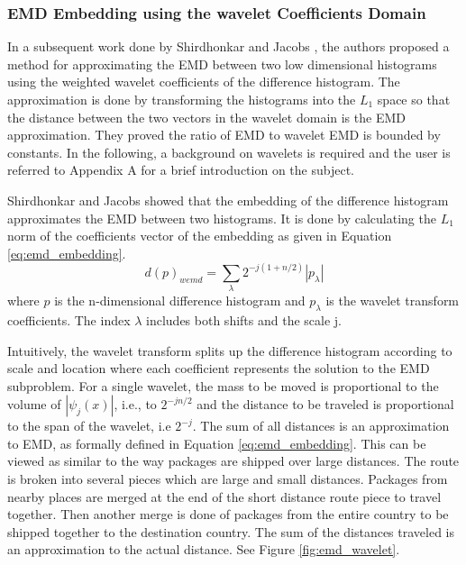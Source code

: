 \subsubsection{EMD Embedding using the wavelet Coefficients Domain}

\iftoggle{edit-mode}{\hspace{0pt}\marginpar{Wavelet embedding}}{}
In a subsequent work done by Shirdhonkar and Jacobs \cite{shirdhonkar2008approximate}, the authors proposed a method for approximating the EMD between two low dimensional histograms using the weighted wavelet coefficients of the difference histogram. The approximation is done by transforming the histograms into the $L_1$ space so that the distance between the two vectors in the wavelet domain is the EMD approximation. They proved the ratio of EMD to wavelet EMD is bounded by constants. In the following, a background on wavelets is required and the user is referred to Appendix A for a brief introduction on the subject.

\iftoggle{edit-mode}{\hspace{0pt}\marginpar{EMD embedding to the wavelet domain}}{}
Shirdhonkar and Jacobs showed that the embedding of the difference histogram approximates the EMD between two histograms. It is done by calculating the $L_1$ norm of the coefficients vector of the embedding as given in Equation \ref{eq:emd_embedding}.
\begin{equation}
d(p)_{wemd}= \sum\limits_{\lambda} 2^{-j(1+n/2)}|p_{\lambda}|
\label{eq:emd_embedding}
\end{equation}
where $p$ is the n-dimensional difference histogram and $p_{\lambda}$ is the wavelet transform coefficients. The index $\lambda$ includes both shifts and the scale j.

\iftoggle{edit-mode}{\hspace{0pt}\marginpar{Intuitive explanation}}{}
Intuitively, the wavelet transform splits up the difference histogram according to scale and location where each coefficient represents the solution to the EMD subproblem. For a single wavelet, the mass to be moved is proportional to the volume of $|\psi_j(x)|$, i.e., to $2^{-jn/2}$ and the distance to be traveled is proportional to the span of the wavelet, i.e $2^{-j}$. The sum of all distances is an approximation to EMD, as formally defined in Equation \ref{eq:emd_embedding}. 
This can be viewed as similar to the way packages are shipped over large distances. The route is broken into several pieces which are large and small distances. Packages from nearby places are merged at the end of the short distance route piece to travel together. Then another merge is done of packages from the entire country to be shipped together to the destination country. The sum of the distances traveled is an approximation to the actual distance. See Figure \ref{fig:emd_wavelet}.

